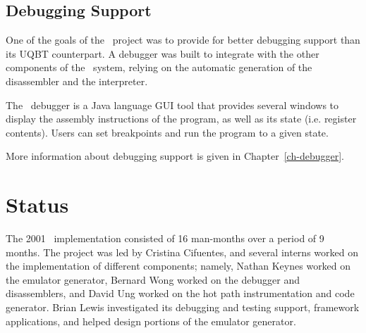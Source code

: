 \subsection{Debugging Support}

One of the goals of the \walk\ project was to provide for better 
debugging support than its UQBT counterpart.  A debugger was 
built to integrate with the other components of the \walk\ system, 
relying on the automatic generation of the disassembler and the 
interpreter. 

The \walk\ debugger is a Java language GUI tool that provides several 
windows to display the assembly instructions of the program, as well 
as its state (i.e. register contents).  Users can set breakpoints and 
run the program to a given state.   

More information about debugging support is given in Chapter~\ref{ch-debugger}.


\section{Status} 

The 2001 \walk\ implementation consisted of 16 man-months over 
a period of 9 months.  The project was led by Cristina Cifuentes, 
and several interns worked on the implementation of different 
components; namely, Nathan Keynes worked on the emulator generator, 
Bernard Wong worked on the debugger and disassemblers, and David 
Ung worked on the hot path instrumentation and code generator.  
Brian Lewis investigated its debugging and testing support, framework
applications, and helped design portions of the emulator generator.



